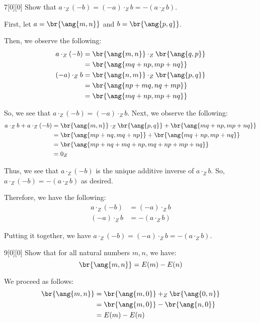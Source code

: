 \documentclass{article}
\begin{document}
\begin{hw}{7}[0][0]
	Show that $a \cdot_{Z} (-b) = (-a) \cdot_{Z} b = - (a \cdot_Z b)$.
\end{hw}
\begin{solution}
	First, let $a = \br{\ang{m,n}}$ and $b = \br{\ang{p,q}}$.
	
	Then, we observe the following:
	\begin{align*}
		a \cdot_Z (-b) &= \br{\ang{m,n}} \cdot_Z \br{\ang{q,p}} \\
		&= \br{\ang{mq + np, mp + nq}} \\
		(-a) \cdot_Z b &= \br{\ang{n,m}} \cdot_Z \br{\ang{p,q}} \\
		&= \br{\ang{np + mq, nq + mp}} \\
		&= \br{\ang{mq + np, mp + nq}}
	\end{align*}

	So, we see that $a \cdot_Z (-b) = (-a) \cdot_Z b$. Next, we observe the following:
	\begin{align*}
		a \cdot_Z b + a\cdot_Z (-b) &= \br{\ang{m,n}} \cdot_Z \br{\ang{p,q}} + \br{\ang{mq + np, mp + nq}} \\
		&= \br{\ang{mp + nq, mq + np}} + \br{\ang{mq + np, mp + nq}} \\
		&= \br{\ang{mp+nq+mq+np, mq+np+mp+nq}} \\
		&= 0_{Z}
	\end{align*}

	Thus, we see that $a\cdot_Z (-b)$ is the unique additive inverse of $a\cdot_{Z} b$. So, $a\cdot_Z(-b) = -(a\cdot_Z b)$ as desired.
	
	Therefore, we have the following:
	\begin{align*}
		a\cdot_Z (-b) &= (-a)\cdot_Z b \\
		(-a)\cdot_{Z} b &= -(a \cdot_Z b)
	\end{align*}

	Putting it together, we have $a \cdot_{Z} (-b) = (-a) \cdot_{Z} b = - (a \cdot_Z b)$.
\end{solution}

\begin{hw}{9}[0][0]
	Show that for all natural numbers $m, n$, we have:
	\begin{equation*}
		\br{\ang{m,n}} = E(m) - E(n)
	\end{equation*}
\end{hw}
\begin{solution}
	We proceed as follows:
	\begin{align*}
		\br{\ang{m,n}} &= \br{\ang{m,0}} +_{Z} \br{\ang{0,n}} \\
		&= \br{\ang{m,0}} - \br{\ang{n,0}} \\
		&= E(m) - E(n)
	\end{align*}
\end{solution}
\end{document}
